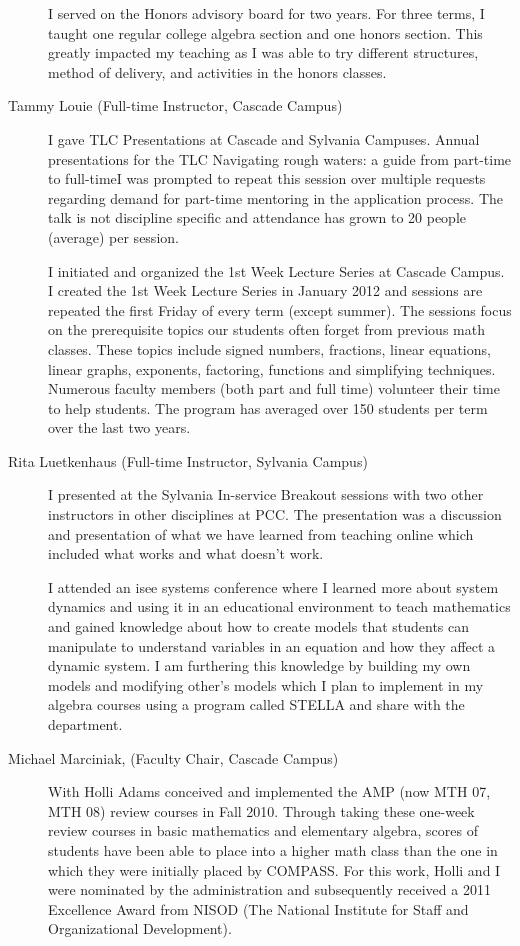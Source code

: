\begin{description}
	I served on the Honors advisory board for two years.  For three terms, I taught
	one regular college algebra section and one honors section. This greatly
	impacted my teaching as I was able to try different structures, method of
	delivery, and activities in the honors classes.

	\item[Tammy Louie (Full-time Instructor, Cascade Campus)]
	I gave TLC Presentations at Cascade and Sylvania Campuses.  Annual
	presentations for the TLC Navigating rough waters: a guide from part-time
	to full-timeI was prompted to repeat this session over multiple requests
	regarding demand for part-time mentoring in the application process. The talk
	is not discipline specific and attendance has grown to 20 people (average) per
	session.

	I initiated and organized the 1st Week Lecture Series at Cascade
	Campus.  I created the 1st Week Lecture Series in January 2012 and sessions are
	repeated the first Friday of every term (except summer). The sessions focus on
	the prerequisite topics our students often forget from previous math classes.
	These topics include signed numbers, fractions, linear equations, linear
	graphs, exponents, factoring, functions and simplifying techniques. Numerous
	faculty members (both part and full time) volunteer their time to help
	students. The program has averaged over 150 students per term over the last two
	years.

	\item[Rita Luetkenhaus (Full-time Instructor, Sylvania Campus)]
	I presented at the Sylvania In-service Breakout sessions with two other
	instructors in other disciplines at PCC.  The presentation was a discussion and
	presentation of what we have learned from teaching online which included what
	works and what doesn't work.

	I attended an isee systems conference where I learned more about system
	dynamics and using it in an educational environment to teach mathematics and
	gained knowledge about how to create models that students can manipulate to
	understand variables in an equation and how they affect a dynamic system.  I am
	furthering this knowledge by building my own models and modifying other's
	models which I plan to implement in my algebra courses using a program called
	STELLA and share with the department.

	\item[Michael Marciniak, (Faculty Chair, Cascade Campus)]
	With Holli Adams conceived and implemented the AMP (now MTH 07, MTH 08) review
	courses in Fall 2010.  Through taking these one-week review courses in basic
	mathematics and elementary algebra, scores of students have been able to place
	into a higher math class than the one in which they were initially placed by
	COMPASS.   For this work, Holli and I were nominated by the administration and
	subsequently received a 2011 Excellence Award from NISOD (The National
	Institute for Staff and Organizational Development).


\end{description}
